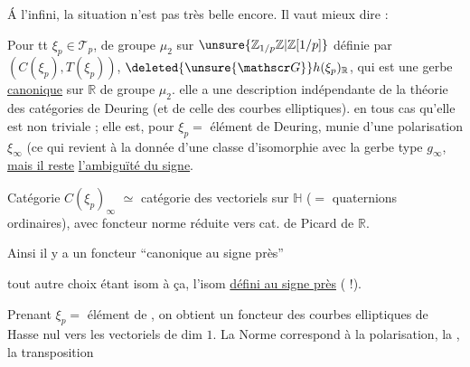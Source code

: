 
Á l'infini, la situation n'est pas très belle encore. Il
vaut mieux dire :

Pour tt $\xi_p\in\mathcal T_p$,   de
groupe $\mu_2$ sur $\unsure{\mathbb Z_{1/p}\mathbb Z|\mathbb Z[1/p]}$ définie par $(C(\xi_p),T(\xi_p))$,  
$\deleted{\unsure{\mathscr G}} h(\xi_p)_{\mathbb R}$, qui est une gerbe \uline{canonique} sur $\mathbb R$ de groupe
$\mu_2$.   elle a une description indépendante
de la théorie des catégories de Deuring (et de celle
des courbes elliptiques).   en tous cas
qu'elle est non triviale ; elle est, pour $\xi_p=$ élément de Deuring,
munie d'une polarisation $\xi_\infty$ (ce qui revient à la
donnée d'une classe d'isomorphie  avec la gerbe
type $g_\infty$, \uline{mais il reste} \uline{l'ambiguïté du signe}.

Catégorie $C(\xi_p)_\infty$  $\simeq$ catégorie des vectoriels   sur
$\mathbb H$ ($=$ quaternions ordinaires), avec
 foncteur norme
réduite vers cat. de Picard de $\mathbb R$.

Ainsi il y a un foncteur ``canonique au signe près''



tout autre choix étant isom
à ça, l'isom \uline{défini au signe près} ( !).

Prenant $\xi_p=$ élément de , on obtient un
foncteur  des courbes elliptiques de Hasse nul
vers les vectoriels  de dim $1$. La  Norme
correspond à la polarisation, la , la transposition

